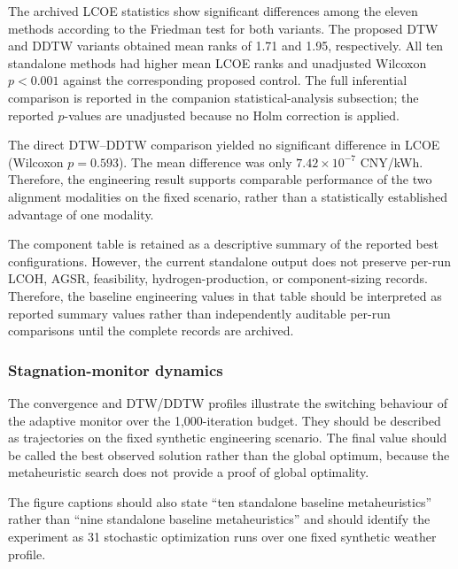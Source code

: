 The archived LCOE statistics show significant differences among the eleven
methods according to the Friedman test for both variants. The proposed DTW and
DDTW variants obtained mean ranks of 1.71 and 1.95, respectively. All ten
standalone methods had higher mean LCOE ranks and unadjusted Wilcoxon
$p<0.001$ against the corresponding proposed control. The full inferential
comparison is reported in the companion statistical-analysis subsection; the
reported $p$-values are unadjusted because no Holm correction is applied.

The direct DTW--DDTW comparison yielded no significant difference in LCOE
(Wilcoxon $p=0.593$). The mean difference was only
$7.42\times10^{-7}$ CNY/kWh. Therefore, the engineering result supports
comparable performance of the two alignment modalities on the fixed scenario,
rather than a statistically established advantage of one modality.

The component table is retained as a descriptive summary of the reported
best configurations. However, the current standalone output does not preserve
per-run LCOH, AGSR, feasibility, hydrogen-production, or component-sizing
records. Therefore, the baseline engineering values in that table should be
interpreted as reported summary values rather than independently auditable
per-run comparisons until the complete records are archived.

\subsubsection{Stagnation-monitor dynamics}
\label{sec:results_hres2_dynamics_revision}

The convergence and DTW/DDTW profiles illustrate the switching behaviour of
the adaptive monitor over the 1,000-iteration budget. They should be described
as trajectories on the fixed synthetic engineering scenario. The final value
should be called the best observed solution rather than the global optimum,
because the metaheuristic search does not provide a proof of global
optimality.

The figure captions should also state ``ten standalone baseline
metaheuristics'' rather than ``nine standalone baseline metaheuristics'' and
should identify the experiment as 31 stochastic optimization runs over one
fixed synthetic weather profile.

